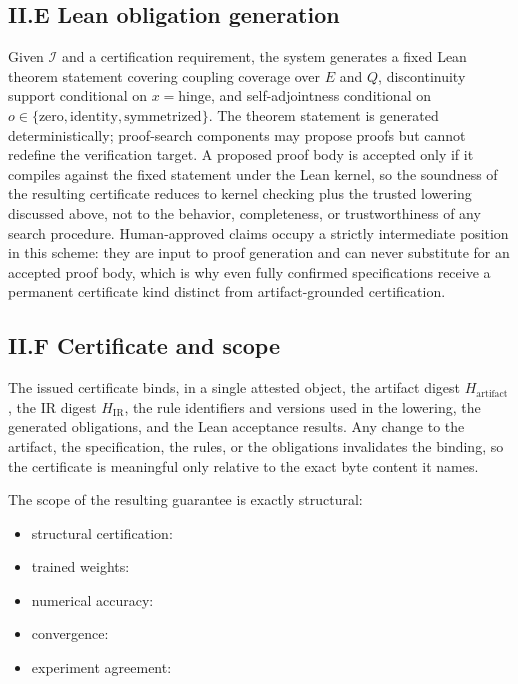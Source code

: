 \subsection*{II.E Lean obligation generation}

Given $\mathcal{I}$ and a certification requirement, the system generates a fixed Lean theorem statement covering coupling coverage over $E$ and $Q$, discontinuity support conditional on $x = \text{hinge}$, and self-adjointness conditional on $o \in \{\text{zero}, \text{identity}, \text{symmetrized}\}$. The theorem statement is generated deterministically; proof-search components may propose proofs but cannot redefine the verification target. A proposed proof body is accepted only if it compiles against the fixed statement under the Lean kernel, so the soundness of the resulting certificate reduces to kernel checking plus the trusted lowering discussed above, not to the behavior, completeness, or trustworthiness of any search procedure. Human-approved claims occupy a strictly intermediate position in this scheme: they are input to proof generation and can never substitute for an accepted proof body, which is why even fully confirmed specifications receive a permanent certificate kind distinct from artifact-grounded certification.

\subsection*{II.F Certificate and scope}

The issued certificate binds, in a single attested object, the artifact digest $H_{\text{artifact}}$, the IR digest $H_{\text{IR}}$, the rule identifiers and versions used in the lowering, the generated obligations, and the Lean acceptance results. Any change to the artifact, the specification, the rules, or the obligations invalidates the binding, so the certificate is meaningful only relative to the exact byte content it names.

The scope of the resulting guarantee is exactly structural:
\begin{itemize}
  \item structural certification: \checkmark
  \item trained weights: 
  \item numerical accuracy: 
  \item convergence: 
  \item experiment agreement: 
\end{itemize}
